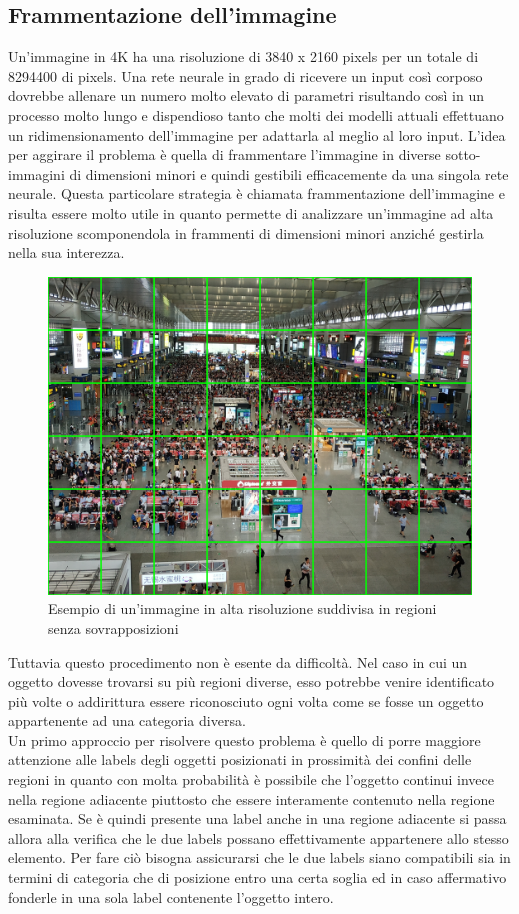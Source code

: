 \subsection{Frammentazione dell'immagine}
Un'immagine in 4K ha una risoluzione di 3840 x 2160 pixels per un totale di 8294400 di pixels. Una rete neurale in grado di ricevere un input così corposo dovrebbe allenare un numero molto elevato di parametri risultando così in un processo molto lungo e dispendioso tanto che molti dei modelli attuali effettuano un ridimensionamento dell'immagine per adattarla al meglio al loro input. L'idea per aggirare il problema è quella di frammentare l'immagine in diverse sotto-immagini di dimensioni minori e quindi gestibili efficacemente da una singola rete neurale. Questa particolare strategia è chiamata frammentazione dell'immagine e risulta essere molto utile in quanto permette di analizzare un'immagine ad alta risoluzione scomponendola in frammenti di dimensioni minori anziché gestirla nella sua interezza.
\begin{figure}[H]
	\centering
	\includegraphics[width=0.5\linewidth]{images/esempio-frammentazione.jpg}
	\caption{Esempio di un'immagine in alta risoluzione suddivisa in regioni senza sovrapposizioni}
	\label{Esempio di un'immagine in alta risoluzione frammentata in regioni senza sovrapposizioni}
\end{figure}
Tuttavia questo procedimento non è esente da difficoltà.  Nel caso in cui un oggetto dovesse trovarsi su più regioni diverse, esso potrebbe venire identificato più volte o addirittura essere riconosciuto ogni volta come se fosse un oggetto appartenente ad una categoria diversa.\\
Un primo approccio per risolvere questo problema è quello di porre maggiore attenzione alle labels degli oggetti posizionati in prossimità dei confini delle regioni in quanto con molta probabilità è possibile che l'oggetto continui invece nella regione adiacente piuttosto che essere interamente contenuto nella regione esaminata. Se è quindi presente una label anche in una regione adiacente si passa allora alla verifica che le due labels possano effettivamente appartenere allo stesso elemento. Per fare ciò bisogna assicurarsi che le due labels siano compatibili sia in termini di categoria  che di posizione entro una certa soglia ed in caso affermativo fonderle in una sola label contenente l'oggetto intero.\\
